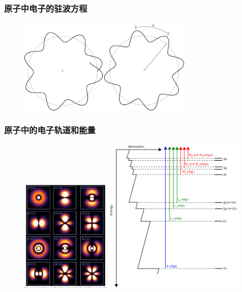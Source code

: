 \frame
{
	\frametitle{原子中电子的驻波方程}
\begin{figure}[h!]
	\vspace{-10.5pt}
\centering
\includegraphics[height=0.38\textwidth,width=0.74\textwidth,viewport=0 0 840 440,clip]{Figures/Standing_wave-atom.png}
\vskip 2pt
\label{Atomic-electron_Standing_wave}
\end{figure}
}


\frame
{
	\frametitle{原子中的电子轨道和能量}
\begin{figure}[h!]
	\vspace{-10.5pt}
\centering
\includegraphics[height=0.60\textwidth,width=0.38\textwidth,viewport=0 10 1280 1900,clip]{Figures/wave_function.png}
\includegraphics[height=0.70\textwidth,width=0.60\textwidth,viewport=0 0 580 600,clip]{Figures/Electron_orbital-energy.png}
\label{Atomic-electron_wave-energy}
\end{figure}
}

